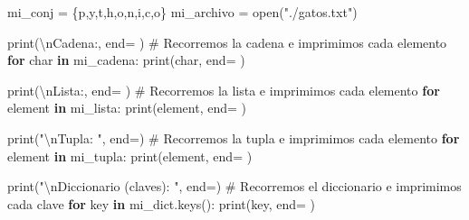 \documentclass[
  spanish,
  letterpaper,
]{scrbook}
\newenvironment{Shaded}{\begin{snugshade}}{\end{snugshade}}
\newcommand{\BuiltInTok}[1]{\textcolor[rgb]{0.00,0.23,0.31}{#1}}
\newcommand{\CharTok}[1]{\textcolor[rgb]{0.13,0.47,0.30}{#1}}
\newcommand{\CommentTok}[1]{\textcolor[rgb]{0.37,0.37,0.37}{#1}}
\newcommand{\ControlFlowTok}[1]{\textcolor[rgb]{0.00,0.23,0.31}{\textbf{#1}}}
\newcommand{\KeywordTok}[1]{\textcolor[rgb]{0.00,0.23,0.31}{\textbf{#1}}}
\newcommand{\NormalTok}[1]{\textcolor[rgb]{0.00,0.23,0.31}{#1}}
\newcommand{\OperatorTok}[1]{\textcolor[rgb]{0.37,0.37,0.37}{#1}}
\newcommand{\StringTok}[1]{\textcolor[rgb]{0.13,0.47,0.30}{#1}}
\theoremstyle{definition}
\theoremstyle{remark}
\begin{document}
\begin{Shaded}
\begin{Highlighting}[]
\NormalTok{mi\_conj }\OperatorTok{=}\NormalTok{ \{}\StringTok{\textquotesingle{}p\textquotesingle{}}\NormalTok{,}\StringTok{\textquotesingle{}y\textquotesingle{}}\NormalTok{,}\StringTok{\textquotesingle{}t\textquotesingle{}}\NormalTok{,}\StringTok{\textquotesingle{}h\textquotesingle{}}\NormalTok{,}\StringTok{\textquotesingle{}o\textquotesingle{}}\NormalTok{,}\StringTok{\textquotesingle{}n\textquotesingle{}}\NormalTok{,}\StringTok{\textquotesingle{}i\textquotesingle{}}\NormalTok{,}\StringTok{\textquotesingle{}c\textquotesingle{}}\NormalTok{,}\StringTok{\textquotesingle{}o\textquotesingle{}}\NormalTok{\}}
\NormalTok{mi\_archivo }\OperatorTok{=} \BuiltInTok{open}\NormalTok{(}\StringTok{"./gatos.txt"}\NormalTok{)}

\BuiltInTok{print}\NormalTok{(}\StringTok{\textquotesingle{}}\CharTok{\textbackslash{}n}\StringTok{Cadena:\textquotesingle{}}\NormalTok{, end}\OperatorTok{=}\StringTok{\textquotesingle{} \textquotesingle{}}\NormalTok{)}
\CommentTok{\# Recorremos la cadena e imprimimos cada elemento }
\ControlFlowTok{for}\NormalTok{ char }\KeywordTok{in}\NormalTok{ mi\_cadena:}
    \BuiltInTok{print}\NormalTok{(char, end}\OperatorTok{=}\StringTok{\textquotesingle{} \textquotesingle{}}\NormalTok{)}

\BuiltInTok{print}\NormalTok{(}\StringTok{\textquotesingle{}}\CharTok{\textbackslash{}n}\StringTok{Lista:\textquotesingle{}}\NormalTok{, end}\OperatorTok{=}\StringTok{\textquotesingle{} \textquotesingle{}}\NormalTok{)}
\CommentTok{\# Recorremos la lista e imprimimos cada elemento }
\ControlFlowTok{for}\NormalTok{ element }\KeywordTok{in}\NormalTok{ mi\_lista:}
    \BuiltInTok{print}\NormalTok{(element, end}\OperatorTok{=}\StringTok{\textquotesingle{} \textquotesingle{}}\NormalTok{)}

\BuiltInTok{print}\NormalTok{(}\StringTok{"}\CharTok{\textbackslash{}n}\StringTok{Tupla: "}\NormalTok{, end}\OperatorTok{=}\StringTok{\textquotesingle{}\textquotesingle{}}\NormalTok{)}
\CommentTok{\# Recorremos la tupla e imprimimos cada elemento }
\ControlFlowTok{for}\NormalTok{ element }\KeywordTok{in}\NormalTok{ mi\_tupla:}
    \BuiltInTok{print}\NormalTok{(element, end}\OperatorTok{=}\StringTok{\textquotesingle{} \textquotesingle{}}\NormalTok{)}

\BuiltInTok{print}\NormalTok{(}\StringTok{"}\CharTok{\textbackslash{}n}\StringTok{Diccionario  (claves): "}\NormalTok{, end}\OperatorTok{=}\StringTok{\textquotesingle{}\textquotesingle{}}\NormalTok{) }
\CommentTok{\# Recorremos el diccionario e imprimimos cada clave }
\ControlFlowTok{for}\NormalTok{ key }\KeywordTok{in}\NormalTok{ mi\_dict.keys():}
    \BuiltInTok{print}\NormalTok{(key, end}\OperatorTok{=}\StringTok{\textquotesingle{} \textquotesingle{}}\NormalTok{)}


\end{Highlighting}
\end{Shaded}
\end{document}
